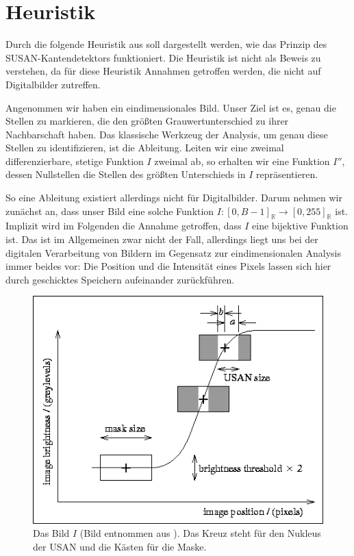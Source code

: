 \documentclass[a4paper, 11pt]{report}
\theoremstyle{definition}
\begin{document}
		\section{Heuristik}\label{sec:heuristic}
			 	Durch die folgende Heuristik aus \cite{SUSAN} soll dargestellt werden, wie das Prinzip des SUSAN-Kantendetektors funktioniert. Die Heuristik ist nicht als Beweis zu verstehen, da für diese Heuristik Annahmen getroffen werden, die nicht auf Digitalbilder zutreffen.

			 	Angenommen wir haben ein eindimensionales Bild. Unser Ziel ist es, genau die Stellen zu markieren, die den größten Grauwertunterschied zu ihrer Nachbarschaft haben. Das klassische Werkzeug der Analysis, um genau diese Stellen zu identifizieren, ist die Ableitung. Leiten wir eine zweimal differenzierbare, stetige Funktion $I$ zweimal ab, so erhalten wir eine Funktion $I''$, dessen Nullstellen die Stellen des größten Unterschieds in $I$ repräsentieren.

			 	So eine Ableitung existiert allerdings nicht für Digitalbilder. Darum nehmen wir zunächst an, dass unser Bild eine solche Funktion $I: [0, B-1]_\mathbb{R} \to [0,255]_\mathbb{R}$ ist. Implizit wird im Folgenden die Annahme getroffen, dass $I$ eine bijektive Funktion ist. Das ist im Allgemeinen zwar nicht der Fall, allerdings liegt uns bei der digitalen Verarbeitung von Bildern im Gegensatz zur eindimensionalen Analysis immer beides vor: Die Position und die Intensität eines Pixels lassen sich hier durch geschicktes Speichern aufeinander zurückführen.

			 	\begin{figure}[H]
			 		\centering
			 		\includegraphics[width=.7\textwidth]{assets/susan-graph.png}
			 		\caption{Das Bild $I$ (Bild entnommen aus \cite{SUSAN}). Das Kreuz steht für den Nukleus der USAN und die Kästen für die Maske.}
			 		\label{fig:susan-graph}
			 	\end{figure}
\end{document}
